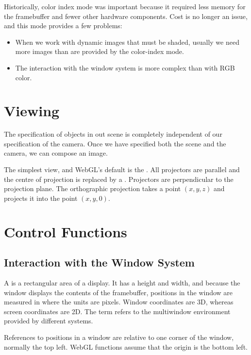 \documentclass[../notes.tex]{subfiles}
\begin{document}
        Historically, color index mode was important because it required less memory
        for the framebuffer and fewer other hardware components.
        Cost is no longer an issue, and this mode provides a few problems:
        \begin{itemize}
          \item When we work with dynamic images that must be shaded,
            usually we need more images than are provided by the color-index mode.
          \item The interaction with the window system is more complex than with RGB color.
        \end{itemize}

    \section{Viewing}
      The specification of objects in out scene is completely independent of our specification
      of the camera.
      Once we have specified both the scene and the camera, we can compose an image.

      The simplest view, and WebGL's default is the .
      All projectors are parallel and the centre of projection is replaced by a
      .
      Projectors are perpendicular to the projection plane.
      The orthographic projection takes a point $(x, y, z)$ and projects it into the point
      $(x, y, 0)$.

    \section{Control Functions}
      \subsection{Interaction with the Window System}
        A  is a rectangular area of a display.
        It has a height and width, and because the window displays the contents of the framebuffer,
        positions in the window are measured in 
        where the units are pixels.
        Window coordinates are 3D, whereas screen coordinates are 2D.
        The term  refers to the multiwindow environment provided
        by different systems.

        References to positions in a window are relative to one corner of the window,
        normally the top left.
        WebGL functions assume that the origin is the bottom left.
\end{document}
